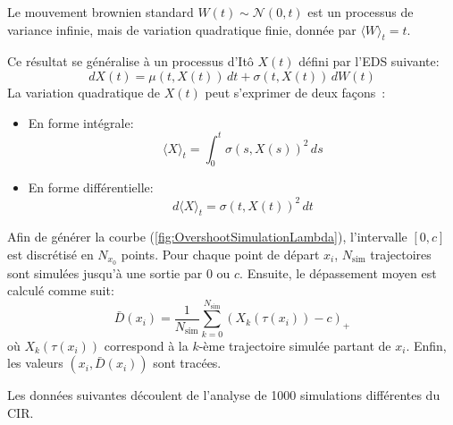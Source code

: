 \label{quadratic_variation}

Le mouvement brownien standard \(W(t) \sim \mathcal{N}(0,t)\) est un processus de variance infinie, mais de variation quadratique finie, donnée par \({\langle W\rangle}_t = t\). 

Ce résultat se généralise à un processus d'Itô \(X(t)\) défini par l'\acs{EDS} suivante:
\[
dX(t) = \mu(t,X(t))\,dt + \sigma(t,X(t))\,dW(t)
\]
La variation quadratique de \(X(t)\) peut s'exprimer de deux façons~\cite{ito1944}:
\begin{itemize}
    \item En forme intégrale:
    \[
    {\langle X\rangle}_t = \int_0^t {\sigma(s,X(s))}^2\,ds
    \]
    \item En forme différentielle:
    \[
    d{\langle X\rangle}_t = {\sigma(t,X(t))}^2\,dt
    \]
\end{itemize}

\label{overshoot_simulations}

Afin de générer la courbe (\ref{fig:OvershootSimulationLambda}), l'intervalle \([0,c]\) est discrétisé en \(N_{x_0}\) points. Pour chaque point de départ \(x_i\), \(N_{\text{sim}}\) trajectoires sont simulées jusqu'à une sortie par 0 ou $c$. Ensuite, le dépassement moyen est calculé comme suit:
\[
\bar{D}(x_i)=\frac{1}{N_{\text{sim}}}\sum_{k=0}^{N_{\text{sim}}}{(X_k(\tau(x_i))-c)}_+
\]
où \(X_k(\tau(x_i))\) correspond à la $k$-ème trajectoire simulée partant de $x_i$. Enfin, les valeurs $(x_i,\bar{D}(x_i))$ sont tracées.

\label{control_simulations}

Les données suivantes découlent de l'analyse de 1000 simulations différentes du \acs{CIR}. 

